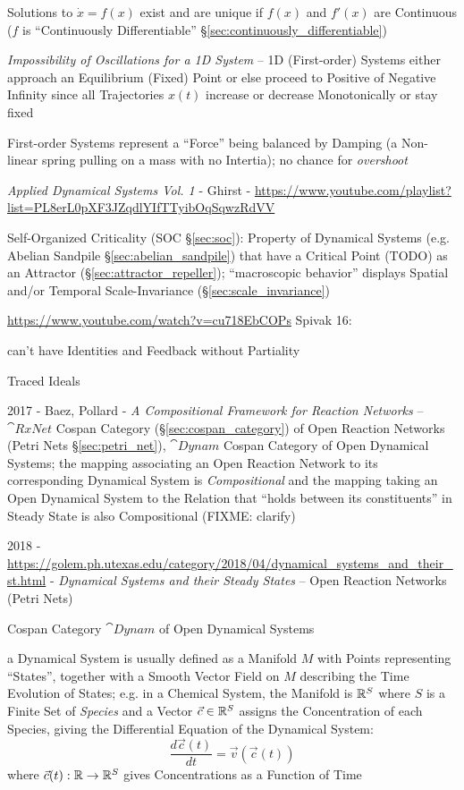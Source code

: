 Solutions to $\dot{x} = f(x)$ exist and are unique if $f(x)$ and $f'(x)$ are
Continuous ($f$ is ``Continuously Differentiable''
\S\ref{sec:continuously_differentiable})

\emph{Impossibility of Oscillations for a 1D System} -- 1D (First-order)
Systems either approach an Equilibrium (Fixed) Point or else proceed to
Positive of Negative Infinity since all Trajectories $x(t)$ increase or
decrease Monotonically or stay fixed

First-order Systems represent a ``Force'' being balanced by Damping (a
Non-linear spring pulling on a mass with no Intertia); no chance for
\emph{overshoot}

\asterism

\emph{Applied Dynamical Systems Vol. 1} - Ghirst -
\url{https://www.youtube.com/playlist?list=PL8erL0pXF3JZqdlYIfTTyibOqSqwzRdVV}

\asterism

\fist Self-Organized Criticality (SOC \S\ref{sec:soc}): Property of Dynamical
Systems (e.g. Abelian Sandpile \S\ref{sec:abelian_sandpile}) that have a
Critical Point (TODO) as an Attractor (\S\ref{sec:attractor_repeller});
``macroscopic behavior'' displays Spatial and/or Temporal Scale-Invariance
(\S\ref{sec:scale_invariance})

\asterism

\url{https://www.youtube.com/watch?v=cu718EbCOPs} Spivak 16:

can't have Identities and Feedback without Partiality %

Traced Ideals %

2017 - Baez, Pollard - \emph{A Compositional Framework for Reaction Networks}
-- $\cat{RxNet}$ Cospan Category (\S\ref{sec:cospan_category}) of Open Reaction
Networks (Petri Nets \S\ref{sec:petri_net}), $\cat{Dynam}$ Cospan Category of
Open Dynamical Systems; the mapping associating an Open Reaction Network to its
corresponding Dynamical System is \emph{Compositional} and the mapping taking
an Open Dynamical System to the Relation that ``holds between its
constituents'' in Steady State is also Compositional (FIXME: clarify)

2018 - \url{https://golem.ph.utexas.edu/category/2018/04/dynamical_systems_and_their_st.html} -
\emph{Dynamical Systems and their Steady States} -- Open Reaction Networks
(Petri Nets)

Cospan Category $\cat{Dynam}$ of Open Dynamical Systems

a Dynamical System is usually defined as a Manifold $M$ with Points
representing ``States'', together with a Smooth Vector Field on $M$ describing
the Time Evolution of States; e.g. in a Chemical System, the Manifold is
$\mathbb{R}^S$ where $S$ is a Finite Set of \emph{Species} and a Vector $\vec{c}
\in \mathbb{R}^S$ assigns the Concentration of each Species, giving the
Differential Equation of the Dynamical System:
\[
  \frac{d\vec{c}(t)}{dt} = \vec{v}(\vec{c}(t))
\]
where $\vec{c}(t) : \mathbb{R} \rightarrow \mathbb{R}^S$ gives Concentrations as a
Function of Time

